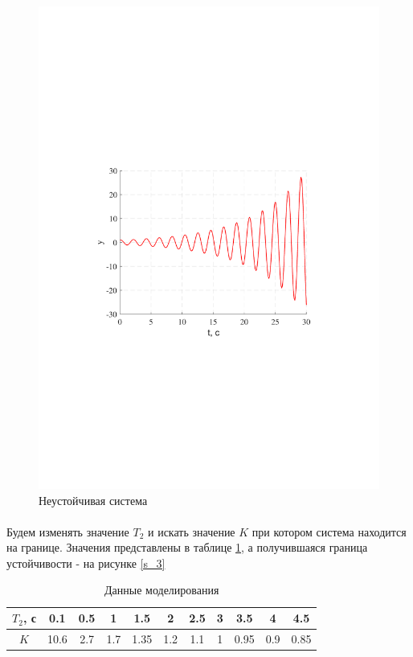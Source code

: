 \documentclass[a4paper,12pt]{article}
\begin{document}
		\begin{figure}[h!]
			\centering
			\includegraphics[width=6in]{NeustMOD.pdf}
			\caption{Неустойчивая система}
			\label{s_23}
		\end{figure}			





	\newpage
	\paragraph{} Будем изменять значение $T_2$ и искать значение $K$ при котором система находится на границе. Значения представлены в таблице \ref{t_1}, а получившаяся граница устойчивости - на рисунке \ref{s_3}
	\begin{table}[h]
		\caption{Данные моделирования}
		\renewcommand{\arraystretch}{2} 
		\renewcommand{\tabcolsep}{0.5cm}
		\begin{center}
			\begin{tabular}{|c|c|c|c|c|c|c|c|c|c|c|}
				\hline
				$T_2$, с & 0.1 & 0.5 & 1 & 1.5 & 2 & 2.5 & 3 & 3.5 & 4 & 4.5 \\ \hline
				$K$ & 10.6 & 2.7 & 1.7 & 1.35 & 1.2 & 1.1 & 1 & 0.95 & 0.9 & 0.85 \\ \hline
			\end{tabular}
		\end{center}
		\label{t_1}
	\end{table}
 
\end{document}
